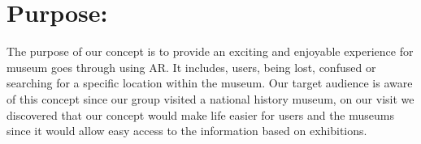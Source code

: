\section{Purpose:}
The purpose of our concept is to provide an exciting and enjoyable experience for museum goes through using AR. It includes, users, being lost, confused or searching for a specific location within the museum. Our target audience is aware of this concept since our group visited a national history museum, on our visit we discovered that our concept would make life easier for users and the museums since it would allow easy access to the information based on exhibitions.
